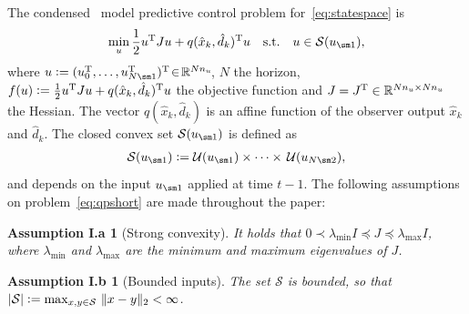 \documentclass[hidelinks]{article}
\begin{document}
The condensed~\cite{MPCBOOK} model predictive control problem for~\eqref{eq:statespace} is
\begin{align}\label{eq:qpshort}
\min_{{u}} \frac{1}{2}\trans{{u}}{J}{u}+\trans{{q}({\hat{x}}_k, {\hat{d}}_k)}{u}\quad\text{s.t.}\quad{u}\in\mathcal{S}({u}_{\sm 1}),
\end{align}
where ${u}\eqdef({u}_0^\Tr,\dots,{u}_{N\sm 1}^\Tr)^\Tr\!\in\!\R^{Nn_u}\!$, $N$ the horizon, $f(u)\vcentcolon=\frac{1}{2}{u}^{\text{T}}{J}{u}+{q}({\hat{x}}_k, {\hat{d}}_k)^{\text{T}}{u}$ the objective function and ${J}={J}^{\text{T}} \in \mathbb{R}^{{Nn_u}\times{Nn_u}}$ the Hessian. The vector ${q}({\hat{x}}_k, {\hat{d}}_k)$ is an affine function of the observer output ${\hat{x}}_k$ and ${\hat{d}}_k$. The closed convex set $\mathcal{S}({u}_{\sm 1})$ is defined as
\begin{align}\label{eq:set}
\mathcal{S}({u}_{\sm 1})\eqdef\mathcal{U}({u}_{\sm 1})\times\dots\times\,\mathcal{U}({u}_{N\sm 2}),
\end{align}
and depends on the input ${u}_{\sm 1}$ applied at time $t-1$. The following assumptions on problem~\eqref{eq:qpshort} are made throughout the paper: 
\newtheorem*{ass1}{Assumption I.a}
\begin{ass1}[Strong convexity]
It holds that $0\prec \lambda_\text{min}I\preceq J\preceq\lambda_\text{max}I$, where $\lambda_\text{min}$ and $\lambda_\text{max}$ are the minimum and maximum eigenvalues of $J$. 
\end{ass1}
\newtheorem*{ass2}{Assumption I.b}
\begin{ass2}[Bounded inputs]
The set $\mathcal{S}$ is bounded, so that $\left\lvert \mathcal{S} \right\rvert\vcentcolon= \max_{x,y\in\mathcal{S}}\,\Vert x-y \Vert_2<\infty$.
\end{ass2}
\end{document}
